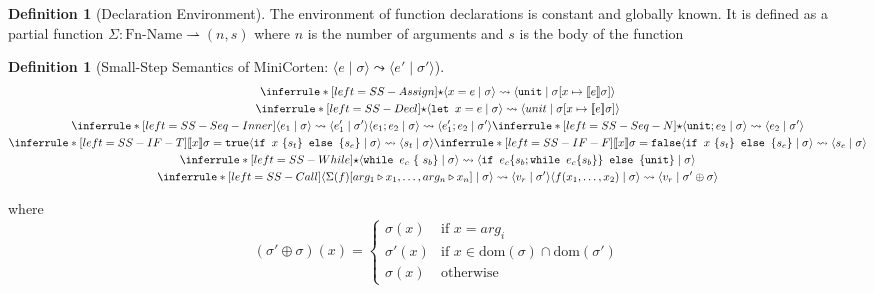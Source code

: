 \documentclass{book}
\newcommand{\code}[1]{\texttt{#1}}
\newcommand{\tuple}[2]{\langle #1 \mid #2 \rangle}
\newcommand{\bbracket}[1]{\llbracket #1 \rrbracket}
\theoremstyle{definition}
\newtheorem{definition}[theorem]{Definition}
\begin{document}
\begin{definition}[Declaration Environment]
  The environment of function declarations is constant and globally known. It is defined as a partial function $\Sigma : \text{Fn-Name} \rightharpoonup (n, s)$ where $n$ is the number of arguments and $s$ is the body of the function
\end{definition}

\begin{definition}[Small-Step Semantics of MiniCorten: $\tuple{e}{\sigma} \leadsto \tuple{e'}{\sigma'}$]

\begin{gather*}
  \inferrule*[left=SS-Assign]
    {\star}
    {\tuple{x = e }{ \sigma } \leadsto \tuple{\code{unit} }{ \sigma[x \mapsto \bbracket{e}\sigma]}}
  \\
  \inferrule*[left=SS-Decl]
    {\star}
    {\tuple{\code{let } x = e}{\sigma} \leadsto \tuple{unit}{\sigma[ x \mapsto \bbracket{e}\sigma]}}
  \\
  \inferrule*[left=SS-Seq-Inner]
      {\tuple{e_1 }{ \sigma } \leadsto \tuple{e_1' }{ \sigma'}}
      {\tuple{e_1; e_2 }{ \sigma } \leadsto \tuple{e_1'; e_2 }{ \sigma'}}
  \inferrule*[left=SS-Seq-N]
    {\star}
    {\tuple{\code{unit}; e_2 }{ \sigma } \leadsto \tuple{e_2 }{ \sigma'}}
  \\
  \inferrule*[left=SS-IF-T]
    {\bbracket{x} \sigma = \code{true}}
    {\tuple{\code{if } x\ \{ s_t \} \code { else } \{ s_e \} }{\sigma} \leadsto \tuple{s_t}{\sigma}}
  \inferrule*[left=SS-IF-F]
    {\bbracket{x}\sigma = \code{false}}
    {\tuple{\code{if } x\ \{ s_t \} \code { else } \{ s_e \} }{\sigma} \leadsto \tuple{s_e}{\sigma}}
  \\
  \inferrule*[left=SS-While]
    {\star}
    {
      \tuple{ \code{while } e_c\ \{\ s_b \}}{\sigma}
      \leadsto
      \tuple{ \code{if } e_c \{ s_b;  \code{while } e_c \{ s_b \} \} { \code{ else } } \{ \code{unit} \} }{\sigma}
    }
  \\
  \inferrule*[left=SS-Call]
    {\tuple{\Sigma(f)[arg_1 \triangleright x_1, \dots, arg_n \triangleright x_n]}{\sigma} \leadsto \tuple{v_r}{\sigma'} }
    {\tuple{f(x_1, \dots, x_2)}{\sigma} \leadsto \tuple{v_r}{\sigma' \oplus \sigma}}
\end{gather*}

where $$(\sigma' \oplus \sigma)(x) =
  \begin{cases}
    \sigma(x) & \text{if } x = arg_i \\
    \sigma'(x) & \text{if } x \in \text{dom}(\sigma) \cap \text{dom}(\sigma')\\
    \sigma(x) & \text{otherwise }
  \end{cases}$$
\end{definition}
\end{document}
